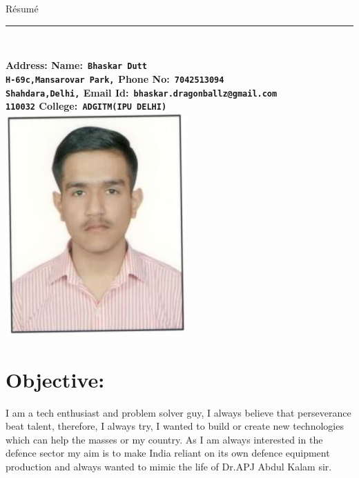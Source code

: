 \documentclass[10pt]{report}
\begin{document}
	
{\huge\hspace{210pt}R\'{e}sum\'{e}}
\\{\noindent\rule{18cm}{0.8pt}\\[4pt]}
\bf Address: \hspace{258pt}\bf Name:\verb| Bhaskar Dutt|
\\
\verb"H-69c,Mansarovar Park,"  \hspace{188pt}\bf Phone No:\verb" 7042513094"
\\{\verb"Shahdara,Delhi,"}   \hspace{226pt}\bf Email Id:\verb" bhaskar.dragonballz@gmail.com"
\\{\verb"110032"}    \hspace{272pt}\bf College:\verb" ADGITM(IPU DELHI)" \\[1pt]
	                  

{\hspace{330pt}\includegraphics[scale =0.5]{bhaskar}\\[3pt]} %
\section*{Objective:}
I am a tech enthusiast and problem solver guy, I always believe that perseverance beat talent, therefore, I always try, I wanted to build or create new technologies which can help the masses or my country. As I am always interested in the defence sector my aim is to make India reliant on its own defence equipment production and always wanted to mimic the life of Dr.APJ Abdul Kalam sir. 
\end{document}
